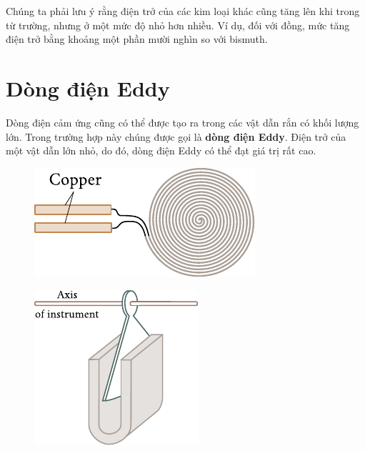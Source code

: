 Chúng ta phải lưu ý rằng điện trở của các kim loại khác cũng tăng lên khi trong từ trường, nhưng ở một mức độ nhỏ hơn nhiều.
Ví dụ, đối với đồng, mức tăng điện trở bằng khoảng một phần mười nghìn so với bismuth.

\section{Dòng điện Eddy}\label{sec:8_4}

Dòng điện cảm ứng cũng có thể được tạo ra trong các vật dẫn rắn có khối lượng lớn.
Trong trường hợp này chúng được gọi là \textbf{dòng điện Eddy}.
Điện trở của một vật dẫn lớn nhỏ, do đó, dòng điện Eddy có thể đạt giá trị rất cao.

\begin{figure}[!h]
	\begin{minipage}[t]{0.48\linewidth}
		\begin{center}
			\includegraphics[scale=1]{figures/ch_08/fig_8_5.pdf}
			\caption[]{}
			\label{fig:8_5}
		\end{center}
	\end{minipage}
	\hfill{ }%
	\begin{minipage}[t]{0.48\linewidth}
		\begin{center}
			\includegraphics[scale=1]{figures/ch_08/fig_8_6.pdf}
			\caption[]{}
			\label{fig:8_6}
		\end{center}
	\end{minipage}
\vspace{-0.4cm}
\end{figure}

